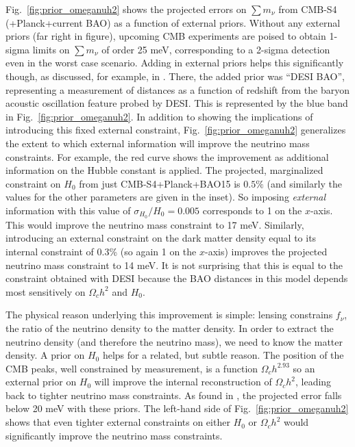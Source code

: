 \documentclass[aps,prd,reprint,superscriptaddress]{revtex4-1}
\newcommand{\yp}[1]{\textcolor{green}{[{\bf YP}: #1]}}
\newcommand{\reffig}[1]{Fig.~\ref{fig:#1}}
\begin{document}
\reffig{prior_omeganuh2} shows the projected errors on $\sum m_\nu$ from CMB-S4 (+Planck+current BAO) as a function of external priors. 
Without any external priors (far right in figure), upcoming CMB experiments are poised to obtain 1-sigma limits on $\sum m_\nu$ of order 25 meV, corresponding to a 2-sigma detection even in the worst case scenario. Adding in external priors helps this significantly though, as discussed, for example, in \cite{2013arXiv1309.5383A,pan:2015,allison:2015}. 
There, the added prior was ``DESI BAO'', representing a measurement of distances as a function of redshift from the baryon acoustic oscillation feature probed by DESI. This is represented by the blue band in \reffig{prior_omeganuh2}. In addition to showing the implications of introducing this fixed external constraint, \reffig{prior_omeganuh2} generalizes the extent to which external information will improve the neutrino mass constraints. For example, the red curve shows the improvement as additional information on the Hubble constant is applied. The projected, marginalized constraint on $H_0$ from just CMB-S4+Planck+BAO15 is $0.5\%$ (and similarly the values for the other parameters are given in the inset). So imposing {\it external} information with this value of $\sigma_{H_0}/H_0=0.005$ corresponds to 1 on the $x$-axis. This would improve the neutrino mass constraint to 17 meV. Similarly, introducing an external constraint on the dark matter density equal to its internal constraint of  0.3\% (so again 1 on the $x$-axis) improves the projected neutrino mass constraint to 14 meV. It is not surprising that this is equal to the constraint obtained with DESI because the BAO distances in this model depends most sensitively on $\Omega_ch^2$ and $H_{0}$.

The physical reason underlying this improvement is simple: lensing constrains $f_\nu$, the ratio of the neutrino density to the matter density. In order to extract the neutrino density (and therefore the neutrino mass), we need to know the matter density. A prior on  $H_{0}$ helps for a related, but subtle reason. 
The position of the CMB peaks, well constrained by measurement, is a function $\Omega_ch^{2.93}$ \cite{planck-collaboration:2014} so an external prior on $H_{0}$ will improve the internal reconstruction of $\Omega_ch^2$, leading back to tighter neutrino mass constraints.
As found in \cite{2013arXiv1309.5383A,pan:2015,allison:2015}, the projected error falls below 20 meV with these priors. 
The left-hand side of \reffig{prior_omeganuh2} shows that even tighter external constraints on either $H_0$ or $\Omega_ch^2$ would significantly improve the neutrino mass constraints.
\end{document}
